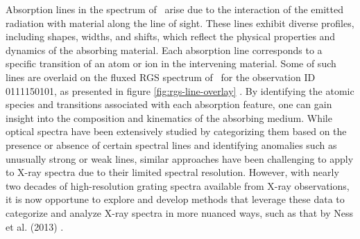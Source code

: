     Absorption lines in the spectrum of \source\ arise due to the interaction of the emitted radiation with material along the line of sight. These lines exhibit diverse profiles, including shapes, widths, and shifts, which reflect the physical properties and dynamics of the absorbing material. Each absorption line corresponds to a specific transition of an atom or ion in the intervening material. Some of such lines are overlaid on the fluxed RGS spectrum of \source\ for the observation ID 0111150101, as presented in figure \ref{fig:rgs-line-overlay} \cite{bhattacharya2020python}. By identifying the atomic species and transitions associated with each absorption feature, one can gain insight into the composition and kinematics of the absorbing medium. While optical spectra have been extensively studied by categorizing them based on the presence or absence of certain spectral lines and identifying anomalies such as unusually strong or weak lines, similar approaches have been challenging to apply to X-ray spectra due to their limited spectral resolution. However, with nearly two decades of high-resolution grating spectra available from X-ray observations, it is now opportune to explore and develop methods that leverage these data to categorize and analyze X-ray spectra in more nuanced ways, such as that by Ness et al. (2013) \cite{ness2013obscuration}.
    
	
    
